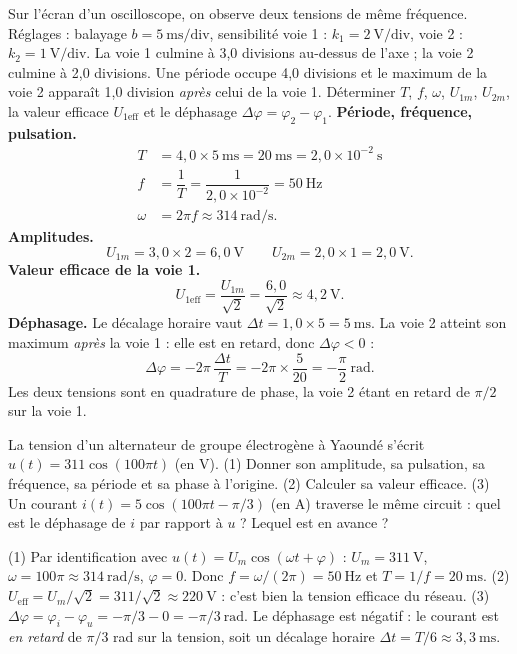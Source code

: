 \documentclass[11pt]{article}
\begin{document}
\begin{exoresolu}
Sur l'écran d'un oscilloscope, on observe deux tensions de même fréquence. Réglages : balayage $b = 5\ \text{ms/div}$, sensibilité voie 1 : $k_1 = 2\ \text{V/div}$, voie 2 : $k_2 = 1\ \text{V/div}$. La voie 1 culmine à 3,0 divisions au-dessus de l'axe ; la voie 2 culmine à 2,0 divisions. Une période occupe 4,0 divisions et le maximum de la voie 2 apparaît 1,0 division \emph{après} celui de la voie 1. Déterminer $T$, $f$, $\omega$, $U_{1m}$, $U_{2m}$, la valeur efficace $U_{1\text{eff}}$ et le déphasage $\Delta\varphi = \varphi_2 - \varphi_1$.
\tcblower
\textbf{Période, fréquence, pulsation.}
\begin{align*}
T &= 4{,}0 \times 5\ \text{ms} = 20\ \text{ms} = 2{,}0\times 10^{-2}\ \text{s} \\
f &= \dfrac{1}{T} = \dfrac{1}{2{,}0\times 10^{-2}} = 50\ \text{Hz} \\
\omega &= 2\pi f \approx 314\ \text{rad/s}.
\end{align*}
\textbf{Amplitudes.}
\[ U_{1m} = 3{,}0 \times 2 = 6{,}0\ \text{V} \qquad U_{2m} = 2{,}0 \times 1 = 2{,}0\ \text{V}. \]
\textbf{Valeur efficace de la voie 1.}
\[ U_{1\text{eff}} = \dfrac{U_{1m}}{\sqrt{2}} = \dfrac{6{,}0}{\sqrt{2}} \approx 4{,}2\ \text{V}. \]
\textbf{Déphasage.} Le décalage horaire vaut $\Delta t = 1{,}0 \times 5 = 5\ \text{ms}$. La voie 2 atteint son maximum \emph{après} la voie 1 : elle est en retard, donc $\Delta\varphi < 0$ :
\[ \Delta\varphi = -2\pi\,\dfrac{\Delta t}{T} = -2\pi\times\dfrac{5}{20} = -\dfrac{\pi}{2}\ \text{rad}. \]
Les deux tensions sont en quadrature de phase, la voie 2 étant en retard de $\pi/2$ sur la voie 1.
\end{exoresolu}

\begin{exercice}
La tension d'un alternateur de groupe électrogène à Yaoundé s'écrit $u(t) = 311\cos(100\pi t)$ (en V). (1) Donner son amplitude, sa pulsation, sa fréquence, sa période et sa phase à l'origine. (2) Calculer sa valeur efficace. (3) Un courant $i(t) = 5\cos(100\pi t - \pi/3)$ (en A) traverse le même circuit : quel est le déphasage de $i$ par rapport à $u$ ? Lequel est en avance ?
\end{exercice}

\begin{corrige}[Exercice 1]
(1) Par identification avec $u(t) = U_m\cos(\omega t + \varphi)$ : $U_m = 311\ \text{V}$, $\omega = 100\pi \approx 314\ \text{rad/s}$, $\varphi = 0$. Donc $f = \omega/(2\pi) = 50\ \text{Hz}$ et $T = 1/f = 20\ \text{ms}$.
(2) $U_{\text{eff}} = U_m/\sqrt{2} = 311/\sqrt{2} \approx 220\ \text{V}$ : c'est bien la tension efficace du réseau.
(3) $\Delta\varphi = \varphi_i - \varphi_u = -\pi/3 - 0 = -\pi/3\ \text{rad}$. Le déphasage est négatif : le courant est \emph{en retard} de $\pi/3$ rad sur la tension, soit un décalage horaire $\Delta t = T/6 \approx 3{,}3\ \text{ms}$.
\end{corrige}
\end{document}
